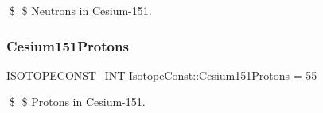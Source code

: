 \$ \$ Neutrons in Cesium-\/151. \mbox{\label{group___isotope_const-_cesium-_cs151_gaf2cad4fb0009eba365def40200c6cb2b}} 
\subsubsection{\texorpdfstring{Cesium151\+Protons}{Cesium151Protons}}
{\footnotesize\ttfamily \mbox{\hyperlink{group___isotope_const-_macros_ga5f18360b3e99483a35c32d789e62621c}{I\+S\+O\+T\+O\+P\+E\+C\+O\+N\+S\+T\+\_\+\+I\+NT}} Isotope\+Const\+::\+Cesium151\+Protons = 55}

\$ \$ Protons in Cesium-\/151. 